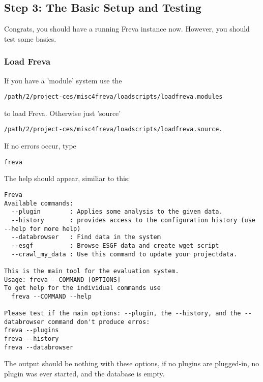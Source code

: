 \documentclass[a4paper,11pt]{ltxdoc}
\begin{document}
\subsection{Step 3: The Basic Setup and Testing}
Congrats, you should have a running Freva instance now. However, you should test some basics.
\subsubsection{Load Freva}
If you have a 'module' system use the 
\begin{lstlisting} 
/path/2/project-ces/misc4freva/loadscripts/loadfreva.modules \end{lstlisting}
to load Freva. Otherwise just 'source'
 \begin{lstlisting} 
/path/2/project-ces/misc4freva/loadscripts/loadfreva.source. \end{lstlisting}
If no errors occur, type 
\begin{lstlisting} 
freva \end{lstlisting}
The help should appear, similiar to this:
\begin{lstlisting}
Freva
Available commands:
  --plugin        : Applies some analysis to the given data.
  --history       : provides access to the configuration history (use --help for more help)
  --databrowser   : Find data in the system
  --esgf          : Browse ESGF data and create wget script
  --crawl_my_data : Use this command to update your projectdata.

This is the main tool for the evaluation system.
Usage: freva --COMMAND [OPTIONS]
To get help for the individual commands use
  freva --COMMAND --help

Please test if the main options: --plugin, the --history, and the --databrowser command don't produce erros:
freva --plugins
freva --history
freva --databrowser
\end{lstlisting}


The output should be nothing with these options, if no plugins are plugged-in, no plugin was ever started, and the database is empty.
\end{document}
